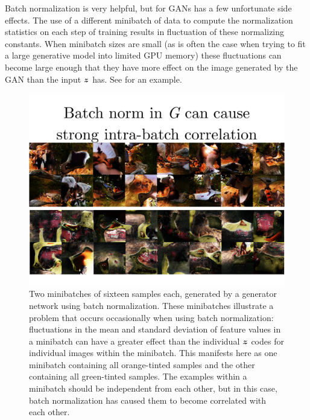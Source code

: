 Batch normalization is very helpful, but for GANs has a few unfortunate side effects.
The use of a different minibatch of data to compute the normalization statistics
on each step of training results in fluctuation of these normalizing constants.
When minibatch sizes are small (as is often the case when trying to fit a large generative
model into limited GPU memory) these fluctuations can become large enough that they
have more effect on the image generated by the GAN than the input ${\bm{z}}$ has.
See  for an example.

\begin{figure}
\centering
\includegraphics[width=\figwidth]{bad_batchnorm}
\caption{
Two minibatches of sixteen samples each, generated by a generator network using
batch normalization.
These minibatches illustrate a problem that occurs occasionally when using batch
normalization: fluctuations in the mean and standard deviation of feature values
in a minibatch can have a greater effect than the individual ${\bm{z}}$ codes for individual
images within the minibatch.
This manifests here as one minibatch containing all orange-tinted samples and the other
containing all green-tinted samples.
The examples within a minibatch should be independent from each other, but in this
case, batch normalization has caused them to become correlated with each other.
}
\label{fig:bad_batchnorm}
\end{figure}

